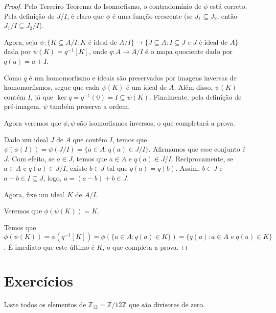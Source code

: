 \begin{proof}
    Pelo Terceiro Teorema do Isomorfismo, o contradomínio de $\phi$ está correto.
    Pela definição de $J/I$, é claro que $\phi$ é uma função crescente (se $J_1\subseteq J_2$, então $J_1/I\subseteq J_2/I$).

    Agora, seja $\psi:\{K\subseteq A/I: K \text{ é ideal de } A/I\}\rightarrow \{J\subseteq A: I\subseteq J \text{ e } J \text{ é ideal de } A\}$ dada por $\psi(K)=q^{-1}[K]$, onde $q:A\rightarrow A/I$ é o mapa quociente dado por $q(a)=a+I$.

    Como $q$ é um homomorfismo e ideais são preservados por imagens inversas de homomorfismos, segue que cada $\psi(K)$ é um ideal de $A$.
    Além disso, $\psi(K)$ contém $I$, já que $\ker q=q^{-1}(0)=I\subseteq \psi(K)$.
    Finalmente, pela definição de pré-imagem, $\psi$ também preserva a ordem.

    Agora veremos que $\phi, \psi$ são isomorfismos inversos, o que completará a prova.

    Dado um ideal $J$ de $A$ que contém $I$, temos que $\psi(\phi(I))=\psi(J/I)=\{a \in A: q(a)\in J/I\}$.
    Afirmamos que esse conjunto é $J$.
    Com efeito, se $a \in J$, temos que $a \in A$ e $q(a)\in J/I$.
    Reciprocamente, se $a \in A$ e $q(a) \in J/I$, existe $b \in J$ tal que $q(a)=q(b)$.
    Assim, $b \in J$ e $a-b \in I\subseteq J$, logo, $a=(a-b)+b\in J$.

    Agora, fixe um ideal $K$ de $A/I$.
    
    Veremos que $\phi(\psi(K))=K$.

    Temos que $\phi(\psi(K))=\phi(q^{-1}[K])=\phi(\{a \in A: q(a)\in K\})=\{q(a): a \in A \text{ e } q(a) \in K\}$.
    É imediato que este último é $K$, o que completa a prova.
\end{proof}

\section{Exercícios}

\begin{exer}
    Liste todos os elementos de $\mathbb Z_{12}=\mathbb Z/12\mathbb Z$ que são divisores de zero.
\end{exer}